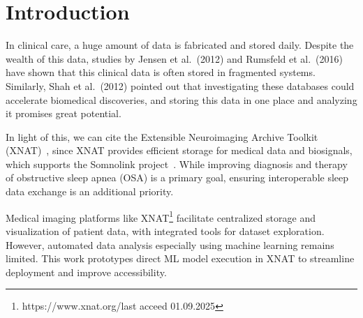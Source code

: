 

\section{Introduction}

In clinical care, a huge amount of data is fabricated and stored daily. 
Despite the wealth of this data, studies by 
Jensen et al.~(2012)\cite{jensen_mining_2012} 
and Rumsfeld et al.~(2016)\cite{rumsfeld_big_2016} 
have shown that this clinical data is often stored in fragmented systems.  
Similarly, Shah et al.~(2012)\cite{shah_coming_2012} pointed out that 
investigating these databases could accelerate biomedical discoveries, and storing this data in one place and analyzing it promises great potential.



In light of this, we can cite the Extensible Neuroimaging Archive Toolkit (XNAT)~\cite{marcus_extensible_2007}, since XNAT provides efficient storage for medical data and biosignals, which supports the Somnolink project~\cite{internetredaktion_somnolink_nodate}. While improving diagnosis and therapy of obstructive sleep apnea (OSA) is a primary goal, ensuring interoperable sleep data exchange is an additional priority.

Medical imaging platforms like XNAT\footnote{https://www.xnat.org/{last acceed 01.09.2025}} facilitate centralized storage and visualization of patient data, with integrated tools for dataset exploration. However, automated data analysis especially using machine learning remains limited. This work prototypes direct ML model execution in XNAT to streamline deployment and improve accessibility.

























 

